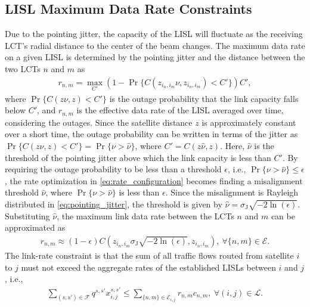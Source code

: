\documentclass[journal]{IEEEtran}
\begin{document}
\subsection{LISL Maximum Data Rate Constraints}
Due to the pointing jitter, the capacity of the LISL will fluctuate as the receiving LCT's radial distance to the center of the beam changes.   
The maximum data rate on a given LISL is determined by the pointing jitter and the distance between the two LCTs $n$ and $m$ as \cite{farid2007outage,lapidoth2009capacity,chaaban2022capacity}
\begin{equation}\label{eq:rate_configuration}
  \begin{aligned}
    r_{n,m} = \max_{C'} (1-\Pr\{C(z_{i_n,i_m}\nu,z_{i_n,i_m}) < C'\}) C',
  \end{aligned}
\end{equation}
where $\Pr\{C(z\nu,z) < C'\}$ is the outage probability that the link capacity falls below $C'$, and
$r_{n,m}$ is the effective data rate of the LISL averaged over time, considering the outages.
Since the satellite distance $z$ is approximately constant over a short time, the outage probability can be written in terms of the jitter as $\Pr\{C(z\nu,z) < C'\} = \Pr\{\nu > \hat{\nu}\}$, where $C' = C(z\hat{\nu},z)$.
Here, $\hat{\nu}$ is the threshold of the pointing jitter above which the link capacity is less than $C'$. By requiring the outage probability to be less than a threshold $\epsilon$, i.e., $\Pr\{\nu > \hat{\nu}\} \leq \epsilon$, the rate optimization in \eqref{eq:rate_configuration} becomes finding a misalignment threshold $\hat{\nu}$, where $\Pr\{\nu > \hat{\nu}\}$ is less than $\epsilon$.
Since the misalignment is Rayleigh distributed in \eqref{eq:pointing_jitter}, the threshold is given by $\hat{\nu} = \sigma_{\mathrm{J}} \sqrt{-2\ln(\epsilon)}$.
Substituting $\hat{\nu}$, the maximum link data rate between the LCTs $n$ and $m$ can be approximated as
\begin{equation}
  \begin{aligned}
    r_{n,m} \approx (1-\epsilon) C(z_{i_n,i_m}\sigma_{\mathrm{J}} \sqrt{-2\ln(\epsilon)},z_{i_n,i_m}), \ \forall \{n,m\} \in \mathcal{E}.
  \end{aligned}
\end{equation}
The link-rate constraint is that the sum of all traffic flows routed from satellite $i$ to $j$ must not exceed the aggregate rates of the established LISLs between $i$ and $j$, i.e.,
\begin{equation}\label{eq:const:path:flow_rate}
  \begin{aligned}
    \sum_{(s,s')\in\mathcal{F}} q^{s,s'} x^{s,s'}_{i,j} \leq \sum_{\{n,m\}\in\mathcal{E}_{i,j}} r_{n,m} c_{n,m},\ \forall (i,j)\in\mathcal{L}.
  \end{aligned} 
\end{equation}
\end{document}
